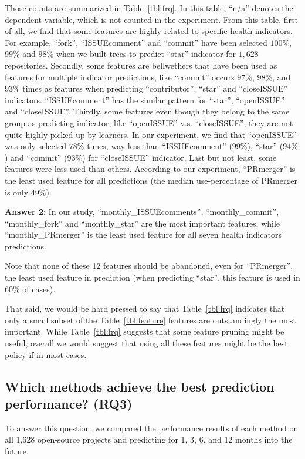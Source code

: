 \documentclass[sigconf,review,anonymous]{acmart}
\newcommand{\tbl}[1]{Table~\ref{tbl:#1}}
\begin{document}
Those counts are summarized in  Table~\ref{tbl:frq}. In this table, ``n/a''  denotes the dependent variable, which is not counted in the experiment. From this table, first of all, we find that some features are highly related to specific health indicators. For example, ``fork'', ``ISSUEcomment'' and  ``commit'' have been selected  $100\%$,  $99\%$ and  $98\%$  when we built trees to predict ``star'' indicator for $1,628$ repositories.  Secondly, some features are bellwethers that have been used as features for multiple indicator predictions, like ``commit'' occurs $97\%$, $98\%$, and $93\%$ times as features when predicting ``contributor'', ``star'' and ``closeISSUE'' indicators. ``ISSUEcomment'' has the similar pattern for ``star'', ``openISSUE'' and ``closeISSUE''. Thirdly, some features even though they belong to the same group as predicting indicator, like ``openISSUE'' v.s. ``closeISSUE'', they are not quite highly picked up by learners. In our experiment, we find that  ``openISSUE'' was only selected $78\%$ times, way less than ``ISSUEcomment'' ($99\%$), ``star'' ($94\%$) and ``commit'' ($93\%$) for ``closeISSUE'' indicator. Last but not least,  some features were less used than others. According to our experiment, ``PRmerger'' is the least used feature for all predictions (the median use-percentage of PRmerger is only 49\%).


\begin{blockquote}
\noindent
\textbf{Answer 2}: In our study, ``monthly\_ISSUEcomments'', ``monthly\_commit'', ``monthly\_fork'' and ``monthly\_star'' are the most important features, while ``monthly\_PRmerger'' is the least used feature for all seven health indicators' predictions.
\end{blockquote}

Note that none of these 12 features should be abandoned, even for ``PRmerger'', the least used feature in prediction (when predicting ``star'', this feature is used in 60\% of cases).

 That said, we would be hard pressed to say
 that Table~\ref{tbl:frq} indicates that only a small subset of the \tbl{feature} features are outstandingly the  most important. While Table~\ref{tbl:frq} suggests that some feature pruning might be useful, overall we would suggest that using all these features might be the best policy if in most cases.



\subsection{Which methods achieve the best prediction performance? (RQ3)}
To answer this question, 
we compared the performance results of each method on all 1,628 open-source projects and predicting for 1, 3, 6, and 12 months into the future.  
\end{document}
